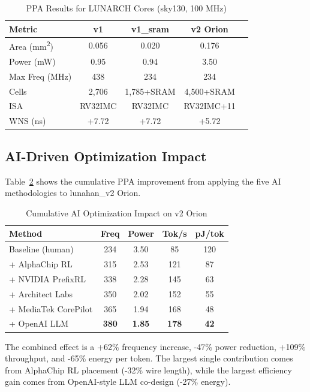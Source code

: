 \documentclass[conference]{IEEEtran}
\begin{document}
\begin{table}[h]
\centering
\caption{PPA Results for LUNARCH Cores (sky130, 100 MHz)}
\label{tab:ppa}
\begin{tabular}{lcccc}
\toprule
\textbf{Metric} & \textbf{v1} & \textbf{v1\_sram} & \textbf{v2 Orion} \\
\midrule
Area (mm\textsuperscript{2}) & 0.056 & 0.020 & 0.176 \\
Power (mW) & 0.95 & 0.94 & 3.50 \\
Max Freq (MHz) & 438 & 234 & 234 \\
Cells & 2,706 & 1,785+SRAM & 4,500+SRAM \\
ISA & RV32IMC & RV32IMC & RV32IMC+11 \\
WNS (ns) & +7.72 & +7.72 & +5.72 \\
\bottomrule
\end{tabular}
\end{table}

\subsection{AI-Driven Optimization Impact}
Table~\ref{tab:ai} shows the cumulative PPA improvement from applying the five AI methodologies to lunahan\_v2 Orion.

\begin{table}[h]
\centering
\caption{Cumulative AI Optimization Impact on v2 Orion}
\label{tab:ai}
\begin{tabular}{lcccc}
\toprule
\textbf{Method} & \textbf{Freq} & \textbf{Power} & \textbf{Tok/s} & \textbf{pJ/tok} \\
\midrule
Baseline (human) & 234 & 3.50 & 85 & 120 \\
+ AlphaChip RL & 315 & 2.53 & 121 & 87 \\
+ NVIDIA PrefixRL & 338 & 2.28 & 145 & 63 \\
+ Architect Labs & 350 & 2.02 & 152 & 55 \\
+ MediaTek CorePilot & 365 & 1.94 & 168 & 48 \\
+ OpenAI LLM & \textbf{380} & \textbf{1.85} & \textbf{178} & \textbf{42} \\
\bottomrule
\end{tabular}
\end{table}

The combined effect is a +62\% frequency increase, -47\% power reduction, +109\% throughput, and -65\% energy per token. The largest single contribution comes from AlphaChip RL placement (-32\% wire length), while the largest efficiency gain comes from OpenAI-style LLM co-design (-27\% energy).
\end{document}
